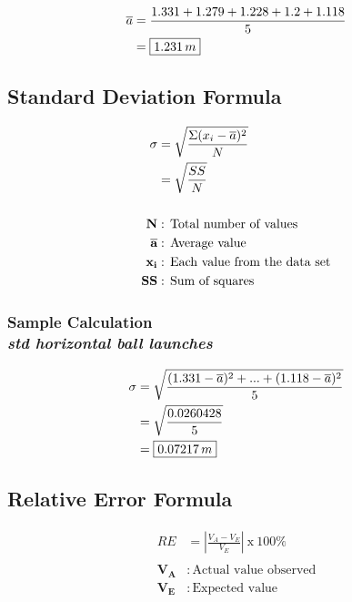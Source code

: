 \begin{align*}
	\overline{a} & = \frac{1.331 + 1.279 + 1.228 + 1.2 + 1.118}{5} \\
							 &= \boxed{1.231\thinspace m}
\end{align*}

\subsection{Standard Deviation Formula}

\begin{align*}
		\sigma &= \sqrt{\frac{\Sigma(x_i -\overline{a})^2}{N}} \\
		 &= \sqrt{\frac{SS}{N}} \\ \\
		\textbf{N} &:\, \text{Total number of values} \\
		\overline{\textbf{a}} &:\, \text{Average value} \\
		\textbf{x\textsubscript{i}} &:\, \text{Each value from the data set} \\
		\textbf{SS} &:\, \text{Sum of squares} 
\end{align*}

\subsubsection{Sample Calculation \\ {\normalfont \small\textit{std horizontal ball launches}}}

\begin{align*}
	\sigma &= \sqrt{\frac{(1.331-\overline{a})^2 + ... + (1.118-\overline{a})^2}{5}} \\
		 &= \sqrt{\frac{0.0260428}{5}} \\
		 &= \boxed{0.07217\thinspace m}
\end{align*}

\subsection{Relative Error Formula}

\begin{align*}
	RE &= \left| {\frac{V_A-V_E}{V_E}} \right|\: \text{x}\: 100\% \\ \\
	\boldsymbol{V_A} &:\, \text{Actual value observed} \\
	\boldsymbol{V_E} &:\, \text{Expected value} 
\end{align*}

